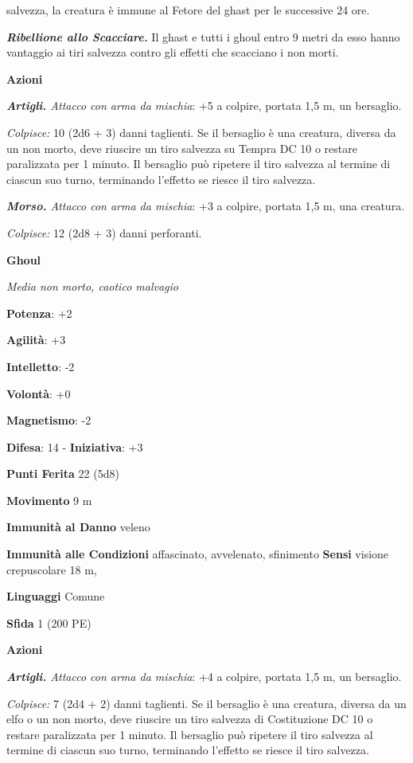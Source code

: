 \begin{multicols}{2}
salvezza, la creatura è immune al Fetore del ghast per le successive 24
ore.

\emph{\textbf{Ribellione allo Scacciare.}} Il ghast e tutti i ghoul
entro 9 metri da esso hanno vantaggio ai tiri salvezza contro gli
effetti che scacciano i non morti.

\textbf{Azioni}

\emph{\textbf{Artigli.} Attacco con arma da mischia}: +5 a colpire,
portata 1,5 m, un bersaglio.

\emph{Colpisce:} 10 (2d6 + 3) danni taglienti. Se il bersaglio è una
creatura, diversa da un non morto, deve riuscire un tiro salvezza su Tempra DC 10 o restare paralizzata per 1 minuto. Il bersaglio può
ripetere il tiro salvezza al termine di ciascun suo turno, terminando
l'effetto se riesce il tiro salvezza.

\emph{\textbf{Morso.} Attacco con arma da mischia}: +3 a colpire,
portata 1,5 m, una creatura.

\emph{Colpisce:} 12 (2d8 + 3) danni perforanti.

\textbf{Ghoul}

\emph{Media non morto, caotico malvagio}

\textbf{Potenza}: +2

\textbf{Agilità}: +3

\textbf{Intelletto}: -2

\textbf{Volontà}: +0

\textbf{Magnetismo}: -2

\textbf{Difesa}: 14 - \textbf{Iniziativa}: +3

\textbf{Punti Ferita} 22 (5d8)

\textbf{Movimento} 9 m

\textbf{Immunità al Danno} veleno

\textbf{Immunità alle Condizioni} affascinato, avvelenato, sfinimento
\textbf{Sensi} visione crepuscolare 18 m, 

\textbf{Linguaggi} Comune

\textbf{Sfida} 1 (200 PE)

\textbf{Azioni}

\emph{\textbf{Artigli.} Attacco con arma da mischia}: +4 a colpire,
portata 1,5 m, un bersaglio.

\emph{Colpisce:} 7 (2d4 + 2) danni taglienti. Se il bersaglio è una
creatura, diversa da un elfo o un non morto, deve riuscire un tiro
salvezza di Costituzione DC 10 o restare paralizzata per 1 minuto. Il
bersaglio può ripetere il tiro salvezza al termine di ciascun suo turno,
terminando l'effetto se riesce il tiro salvezza.


\end{multicols}
